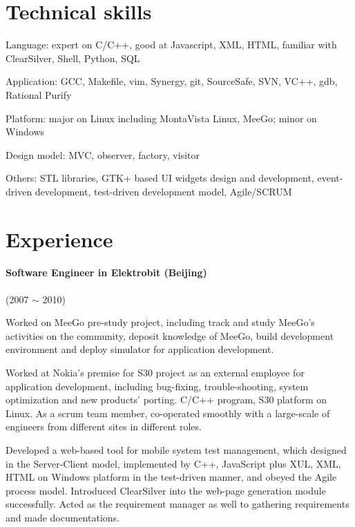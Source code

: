 \documentclass[a4paper,11pt]{article}
\begin{document}
\section*{Technical skills}
\begin{description*}
    \setlength\itemindent{0cm}
    \setlength\itemsep{0.4em}
  \item [Language:] expert on C/C++, good at Javascript, XML, HTML, familiar with ClearSilver, Shell, Python, SQL
  \item [Application:] GCC, Makefile, vim, Synergy, git, SourceSafe, SVN, VC++, gdb, Rational Purify
  \item [Platform:] major on Linux including MontaVista Linux, MeeGo; minor on Windows
  \item [Design model:] MVC, observer, factory, visitor
  \item [Others:] STL libraries, GTK+ based UI widgets design and development, event-driven development, test-driven development model, Agile/SCRUM
\end{description*}

\section*{Experience}

\paragraph{Software Engineer in Elektrobit (Beijing)} (2007 $\sim$ 2010)
\begin{itemize*}
    \setlength\itemsep{0.4em}
  \item Worked on MeeGo pre-study project, including track and study MeeGo's activities on the community, deposit knowledge of MeeGo, build development environment and deploy simulator for application development.
  \item Worked at Nokia's premise for S30 project as an external employee for application development, including bug-fixing, trouble-shooting, system optimization and new products' porting. C/C++ program, S30 platform on Linux. As a scrum team member, co-operated smoothly with a large-scale of engineers from different sites in different roles.
  \item Developed a web-based tool for mobile system test management, which designed in the Server-Client model, implemented by C++, JavaScript plus XUL, XML, HTML on Windows platform in the test-driven manner, and obeyed the Agile process model. Introduced ClearSilver into the web-page generation module successfully. Acted as the requirement manager as well to gathering requirements and made documentations.
\end{itemize*}
\end{document}
